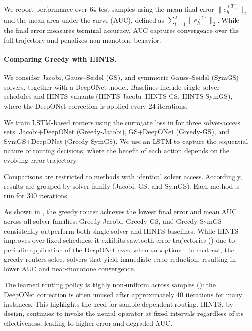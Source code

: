 \documentclass{article}
\begin{document}
We report performance over $64$ test samples using the mean final error $\|e_h^{(T)}\|_2$ and the mean area under the curve (AUC), defined as $\sum_{t=1}^T \|e_h^{(t)}\|_2$. While the final error measures terminal accuracy, AUC captures convergence over the full trajectory and penalizes non-monotone behavior.

\paragraph{Comparing Greedy with HINTS.}
We consider Jacobi, Gauss–Seidel (GS), and symmetric Gauss–Seidel (SymGS) solvers, together with a DeepONet model. Baselines include single-solver schedules and HINTS variants (HINTS-Jacobi, HINTS-GS, HINTS-SymGS), where the DeepONet correction is applied every 24 iterations. 

We train LSTM-based routers using the surrogate loss in  for three solver-access sets: Jacobi+DeepONet (Greedy-Jacobi), GS+DeepONet (Greedy-GS), and SymGS+DeepONet (Greedy-SymGS). We use an LSTM to capture the sequential nature of routing decisions, where the benefit of each action depends on the evolving error trajectory.

Comparisons are restricted to methods with identical solver access. Accordingly, results are grouped by solver family (Jacobi, GS, and SymGS). Each method is run for 300 iterations.


As shown in , the greedy router achieves the lowest final error and mean AUC across all solver families: Greedy-Jacobi, Greedy-GS, and Greedy-SymGS consistently outperform both single-solver and HINTS baselines. While HINTS improves over fixed schedules, it exhibits sawtooth error trajectories () due to periodic application of the DeepONet even when suboptimal. In contrast, the greedy routers select solvers that yield immediate error reduction, resulting in lower AUC and near-monotone convergence.

The learned routing policy is highly non-uniform across samples (): the DeepONet correction is often unused after approximately 40 iterations for many instances. This highlights the need for sample-dependent routing. HINTS, by design, continues to invoke the neural operator at fixed intervals regardless of its effectiveness, leading to higher error and degraded AUC.
\end{document}
